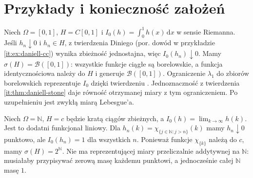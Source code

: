 \section{Przykłady i konieczność założeń}
\begin{przyklad}
Niech $\Omega=[0,1]$, $H=C[0,1]$ i $I_0(h)=\int_0^1h(x)\,\mathrm dx$ w sensie Riemanna. Jeśli $h_n\downarrow0$ i $h_n\in H$, z twierdzenia Diniego (por. dowód w przykładzie \ref{it:ex:daniell-cc}) wynika zbieżność jednostajna, więc $I_0(h_n)\downarrow0$. Mamy $\sigma(H)=\mathcal B([0,1])$: wszystkie funkcje ciągłe są borelowskie, a funkcja identycznościowa należy do $H$ i generuje $\mathcal B([0,1])$. Ograniczenie $\lambda_1$ do zbiorów borelowskich reprezentuje $I_0$ dzięki twierdzeniu . Jednoznaczność z twierdzenia \ref{it:thm:daniell-stone} daje równość otrzymanej miary z tym ograniczeniem. Po uzupełnieniu jest zwykłą miarą Lebesgue'a.
\end{przyklad}
\begin{przyklad}
Niech $\Omega=\mathbb{N}$, $H=c$ będzie kratą ciągów zbieżnych, a $I_0(h)=\lim_{k\to\infty}h(k)$. Jest to dodatni funkcjonał liniowy. Dla $h_n(k)=\chi_{\{j\in\mathbb{N}:j>n\}}(k)$ mamy $h_n\downarrow0$ punktowo, ale $I_0(h_n)=1$ dla wszystkich $n$. Ponieważ funkcje $\chi_{\{k\}}$ należą do $c$, mamy $\sigma(H)=2^\mathbb{N}$. Nie ma reprezentującej miary przeliczalnie addytywnej na $\mathbb{N}$: musiałaby przypisywać zerową masę każdemu punktowi, a jednocześnie całej $\mathbb{N}$ masę $1$.
\end{przyklad}

